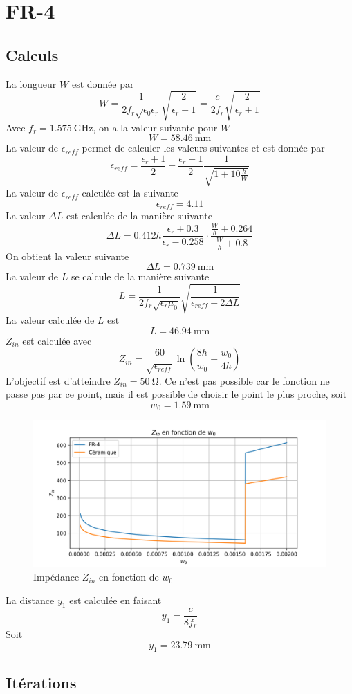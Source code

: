 \documentclass[Deriaz_Traiber_Labo02.tex]{subfiles}
\begin{document}
\section{FR-4}
\subsection{Calculs}
La longueur $W$ est donnée par
$$W=\frac{1}{2f_r\sqrt{\epsilon_0\epsilon_r}}\sqrt{\frac{2}{\epsilon_r+1}}=\frac{c}{2f_r}\sqrt{\frac{2}{\epsilon_r+1}}$$
Avec $f_r=\SI{1.575}{\giga\hertz}$, on a la valeur suivante pour $W$
$$W=\SI{58.46}{\milli\meter}$$
La valeur de $\epsilon_{reff}$ permet de calculer les valeurs suivantes et est donnée par
$$\epsilon_{reff}=\frac{\epsilon_r+1}{2}+\frac{\epsilon_r-1}{2}\frac{1}{\sqrt{1+10\frac{h}{W}}}$$
La valeur de $\epsilon_{reff}$ calculée est la suivante
$$\epsilon_{reff}=4.11$$
La valeur $\Delta L$ est calculée de la manière suivante
$$\Delta L=0.412h\frac{\epsilon_r+0.3}{\epsilon_r-0.258}\cdot\frac{\frac{W}{h}+0.264}{\frac{W}{h}+0.8}$$
On obtient la valeur suivante
$$\Delta L=\SI{0.739}{\milli\meter}$$
La valeur de $L$ se calcule de la manière suivante
$$L=\frac{1}{2f_r\sqrt{\epsilon_r\mu_0}}\sqrt{\frac{1}{\epsilon_{reff}-2\Delta L}}$$
La valeur calculée de $L$ est
$$L=\SI{46.94}{\milli\meter}$$
$Z_{in}$ est calculée avec
$$Z_{in}=\frac{60}{\sqrt{\epsilon_{reff}}}\ln\left(\frac{8h}{w_0}+\frac{w_0}{4h}\right)$$
L'objectif est d'atteindre $Z_{in}=\SI{50}{\ohm}$. Ce n'est pas possible car le fonction ne passe pas par ce point, mais il est possible de choisir le point le plus proche, soit
$$w_0=\SI{1.59}{\milli\meter}$$
\begin{figure}[H]
\centering
\includegraphics[width=12cm]{../Calculs/w0.png}
\caption{Impédance $Z_{in}$ en fonction de $w_0$}
\end{figure}
La distance $y_1$ est calculée en faisant
$$y_1=\frac{c}{8f_r}$$
Soit
$$y_1=\SI{23.79}{\milli\meter}$$
\subsection{Itérations}
\end{document}
